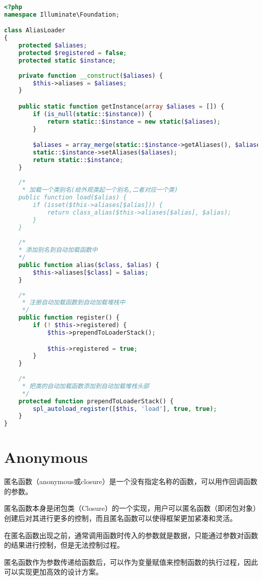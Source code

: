 \begin{lstlisting}[language=PHP]
<?php
namespace Illuminate\Foundation;

class AliasLoader
{
    protected $aliases;
    protected $registered = false;
    protected static $instance;
    
    private function __construct($aliases) {
        $this->aliases = $aliases;
    }

    public static function getInstance(array $aliases = []) {
        if (is_null(static::$instance)) {
            return static::$instance = new static($aliases);
        }

        $aliases = array_merge(static::$instance->getAliases(), $aliases);
        static::$instance->setAliases($aliases);
        return static::$instance;
    }
    
    /*
     * 加载一个类别名(给外观类起一个别名,二者对应一个类)
    public function load($alias) {
        if (isset($this->aliases[$alias])) {
            return class_alias($this->aliases[$alias], $alias);
        }
    }
    
    /*
    * 添加别名到自动加载函数中
    */
    public function alias($class, $alias) {
        $this->aliases[$class] = $alias;
    }
    
    /*
     * 注册自动加载函数到自动加载堆栈中
     */
    public function register() {
        if (! $this->registered) {
            $this->prependToLoaderStack();

            $this->registered = true;
        }
    }
    
    /*
     * 把类的自动加载函数添加到自动加载堆栈头部
     */
    protected function prependToLoaderStack() {
        spl_autoload_register([$this, 'load'], true, true);
    }
}
\end{lstlisting}

\chapter{Anonymous}

匿名函数（anonymous或closure）是一个没有指定名称的函数，可以用作回调函数的参数。

匿名函数本身是闭包类（Closure）的一个实现，用户可以匿名函数（即闭包对象）创建后对其进行更多的控制，而且匿名函数可以使得框架更加紧凑和灵活。

在匿名函数出现之前，通常调用函数时传入的参数就是数据，只能通过参数对函数的结果进行控制，但是无法控制过程。

匿名函数作为参数传递给函数后，可以作为变量赋值来控制函数的执行过程，因此可以实现更加高效的设计方案。



